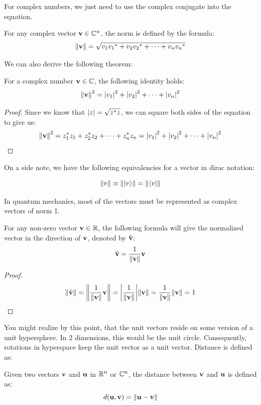 \documentclass[12pt]{article}
\begin{document}
For complex numbers, we just need to use the complex conjugate into the equation. 

\begin{definition}
    For any complex vector $\mathbf{v} \in \mathbb{C}^n$, the norm is defined by the formula: 
    $$\norm{\mathbf{v}} = \sqrt{v_1 {v_1}^* + v_2 {v_2}^* + \cdots + v_n {v_n}^* }$$
\end{definition}

We can also derive the following theorem:

\begin{theorem}
    For a complex number $\mathbf{v} \in \mathbb{C}$, the following identity holds:
    $$\norm{\mathbf{v}}^2 = \abs{v_1}^2 + \abs{v_2}^2 + \cdots + \abs{v_n}^2$$
\end{theorem}

\begin{proof}
    Since we know that $\abs{z} = \sqrt{z^* z}$, we can square both sides of the equation to give us:
    $$\norm{\mathbf{v}}^2 = z_1^* z_1 + z_2^* z_2 + \cdots + z_n^* z_n = \abs{v_1}^2 + \abs{v_2}^2 + \cdots + \abs{v_n}^2$$
\end{proof}

On a side note, we have the following equivalencies for a vector in dirac notation:

$$\norm{v} \equiv \norm{\ket{v}} = \norm{\bra{v}}$$

In quantum mechanics, most of the vectors must be represented as complex vectors of norm 1. 

\begin{theorem}
    For any non-zero vector $\mathbf{v} \in \mathbb{R}$, the following formula will give the normalized vector in the direction of $\mathbf{v}$, denoted by $\hat{\mathbf{v}}$: $$\hat{\mathbf{v}} = \frac{1}{\norm{\mathbf{v}}}\mathbf{v}$$ 
\end{theorem}

\begin{proof}
    $$
    \norm{\hat{\mathbf{v}}} = \norm{\frac{1}{\norm{\mathbf{v}}}\mathbf{v}} = \abs{\frac{1}{\norm{\mathbf{v}}}}\norm{\mathbf{v}} = \frac{1}{\norm{\mathbf{v}}}\norm{\mathbf{v}} = 1
    $$
\end{proof}

You might realize by this point, that the unit vectors reside on some version of a unit hypersphere. In 2 dimensions, this would be the unit circle. Consequently, rotations in hyperspace keep the unit vector as a unit vector. Distance is defined as:

\begin{definition}[Distance]
    Given two vectors $\mathbf{v}$ and $\mathbf{u}$ in $\mathbb{R}^n$ or $\mathbb{C}^n$, the distance between $\mathbf{v}$ and $\mathbf{u}$ is defined as:
    $$d(\mathbf{u}, \mathbf{v}) = \norm{\mathbf{u} - \mathbf{v}}$$
\end{definition}
\end{document}
